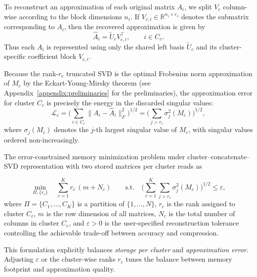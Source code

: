 \documentclass[10pt]{article} %
\begin{document}
To reconstruct an approximation of each original matrix \(A_i\), 
we split \(V_c\) column-wise according to the block dimensions \(n_i\). 
If \(V_{c,i} \in \mathbb{R}^{n_i\times r_c}\) denotes the submatrix corresponding 
to \(A_i\), then the recovered approximation is given by
\[
\widehat{A}_i = \widetilde U_c V_{c,i}^\top,
\qquad i\in C_c.
\]
Thus each \(A_i\) is represented using only the shared left basis \(\widetilde U_c\) 
and its cluster-specific coefficient block \(V_{c,i}\).

Because the rank-\(r_c\) truncated SVD is the optimal Frobenius norm
approximation of \(M_c\) by the Eckart-Young-Mirsky theorem (see Appendix~\ref{appendix:preliminaries} for the preliminaries),
the approximation error for cluster \(C_c\) is precisely the energy in the discarded 
singular values:
\[
\mathcal{L}_c
= \Bigg(\sum_{i\in C_c} \|A_i - \widehat{A}_i\|_F^2\Bigg)^{1/2}
= \Bigg(\sum_{j>r_c}\sigma_j^2(M_c)\Bigg)^{1/2},
\]
where \(\sigma_j(M_c)\) denotes the \(j\)-th largest singular value of \(M_c\),
with singular values ordered non-increasingly.

The error-constrained memory minimization problem under cluster--concatenate--SVD representation with two stored matrices per cluster reads as

\begin{equation}
\min_{\Pi,\{r_c\}} \quad \sum_{c=1}^K r_c\,(m+N_c)
\qquad \text{s.t.}\quad 
\Bigg(\sum_{c=1}^K \sum_{j>r_c} \sigma_j^2(M_c)\Bigg)^{1/2} \le \varepsilon,
\label{eq:cluster}
\end{equation}
where \(\Pi = \{C_1,\dots,C_K\}\) is a partition of \(\{1,\dots,N\}\),
\(r_c\) is the rank assigned to cluster \(C_c\),
\(m\) is the row dimension of all matrices,
\(N_c\) is the total number of columns in cluster \(C_c\),
and \(\varepsilon > 0\) is the user-specified reconstruction tolerance controlling
the achievable trade-off between accuracy and compression.

This formulation explicitly balances \emph{storage per cluster} and \emph{approximation error}. Adjusting \(\varepsilon\) or the cluster-wise ranks \(r_c\) tunes the balance 
between memory footprint and approximation quality.
\end{document}

